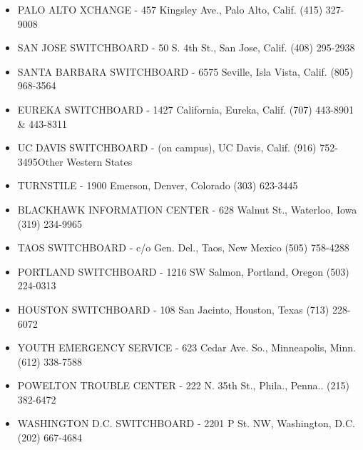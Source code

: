 \documentclass[11pt,twoside,a4paper]{book}
\begin{document}
\begin{minipage}[t]{0.20\textwidth}
\begin{scriptsize}
\begin{itemize}
	\item[] PALO ALTO XCHANGE - 457 Kingsley Ave., Palo Alto, Calif. (415) 327-9008 
	\item[] SAN JOSE SWITCHBOARD - 50 S. 4th St., San Jose, Calif. (408) 295-2938 
	\item[] SANTA BARBARA SWITCHBOARD - 6575 Seville, Isla Vista, Calif. (805) 968-3564 
	\item[] EUREKA SWITCHBOARD - 1427 California, Eureka, Calif. (707) 443-8901 \& 443-8311 
	\item[] UC DAVIS SWITCHBOARD - (on campus), UC Davis, Calif. (916) 752-3495Other Western States
	\item[] TURNSTILE - 1900 Emerson, Denver, Colorado (303) 623-3445 
	\item[] BLACKHAWK INFORMATION CENTER - 628 Walnut St., Waterloo, Iowa (319) 234-9965 
	\item[] TAOS SWITCHBOARD - c/o Gen. Del., Taos, New Mexico (505) 758-4288 
	\item[] PORTLAND SWITCHBOARD - 1216 SW Salmon, Portland, Oregon (503) 224-0313 
	\item[] HOUSTON SWITCHBOARD - 108 San Jacinto, Houston, Texas (713) 228-6072 
	\item[] YOUTH EMERGENCY SERVICE - 623 Cedar Ave. So., Minneapolis, Minn. (612) 338-7588 
	\item[] POWELTON TROUBLE CENTER - 222 N. 35th St., Phila., Penna.. (215) 382-6472 
	\item[] WASHINGTON D.C. SWITCHBOARD - 2201 P St. NW, Washington, D.C. (202) 667-4684 
\end{itemize}
\end{scriptsize}
\end{minipage}\hfill
\end{document}
